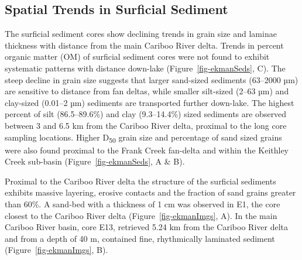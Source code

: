 \documentclass[
  letterpaper,
  DIV=11,
  numbers=noendperiod]{scrartcl}
\begin{document}
\hypertarget{spatial}{%
\subsection{Spatial Trends in Surficial Sediment}\label{spatial}}

The surficial sediment cores show declining trends in grain size and
laminae thickness with distance from the main Cariboo River delta.
Trends in percent organic matter (OM) of surficial sediment cores were
not found to exhibit systematic patterns with distance down-lake
(Figure~\ref{fig-ekmanSeds}, C). The steep decline in grain size
suggests that larger sand-sized sediments (63--2000 µm) are sensitive to
distance from fan deltas, while smaller silt-sized (2--63 µm) and
clay-sized (0.01--2 µm) sediments are transported further down-lake. The
highest percent of silt (86.5--89.6\%) and clay (9.3--14.4\%) sized
sediments are observed between 3 and 6.5 km from the Cariboo River
delta, proximal to the long core sampling locations. Higher
D\textsubscript{50} grain size and percentage of sand sized grains were
also found proximal to the Frank Creek fan-delta and within the Keithley
Creek sub-basin (Figure~\ref{fig-ekmanSeds}, A \& B).

Proximal to the Cariboo River delta the structure of the surficial
sediments exhibits massive layering, erosive contacts and the fraction
of sand grains greater than 60\%. A sand-bed with a thickness of 1 cm
was observed in E1, the core closest to the Cariboo River delta
(Figure~\ref{fig-ekmanImgs}, A). In the main Cariboo River basin, core
E13, retrieved 5.24 km from the Cariboo River delta and from a depth of
40 m, contained fine, rhythmically laminated sediment
(Figure~\ref{fig-ekmanImgs}, B).
\end{document}
